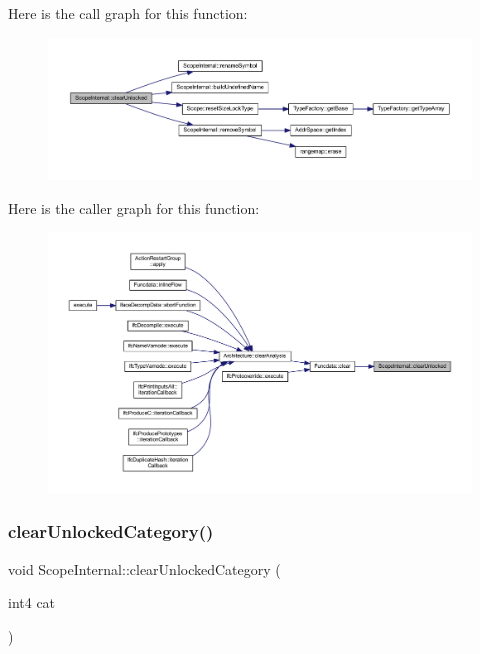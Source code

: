 Here is the call graph for this function\+:
\nopagebreak
\begin{figure}[H]
\begin{center}
\leavevmode
\includegraphics[width=350pt]{class_scope_internal_ab95e3712f0b536e014bfb3c8d3d2287a_cgraph}
\end{center}
\end{figure}
Here is the caller graph for this function\+:
\nopagebreak
\begin{figure}[H]
\begin{center}
\leavevmode
\includegraphics[width=350pt]{class_scope_internal_ab95e3712f0b536e014bfb3c8d3d2287a_icgraph}
\end{center}
\end{figure}
\mbox{\label{class_scope_internal_ac73cc9a432d1e7a383c9758486ffe58d}} 
\subsubsection{\texorpdfstring{clearUnlockedCategory()}{clearUnlockedCategory()}}
{\footnotesize\ttfamily void Scope\+Internal\+::clear\+Unlocked\+Category (\begin{DoxyParamCaption}\item[{int4}]{cat }\end{DoxyParamCaption})\hspace{0.3cm}{\ttfamily [virtual]}}



